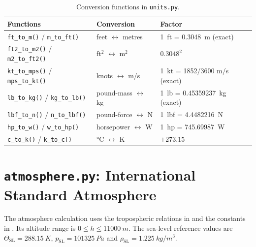 \documentclass[11pt,letterpaper]{article}
\numberwithin{equation}{section}
\newcommand{\code}[1]{\textmd{\texttt{#1}}}
\begin{document}
\begin{table}[H]
\centering
\small
\begin{tabular}{@{}lll@{}}
\toprule
\textbf{Functions} & \textbf{Conversion} & \textbf{Factor}\\
\midrule
\code{ft\_to\_m()} / \code{m\_to\_ft()} & feet $\leftrightarrow$ metres & \SI{1}{ft} = \SI{0.3048}{m} (exact)\\
\code{ft2\_to\_m2()} / \code{m2\_to\_ft2()} & ft$^2$ $\leftrightarrow$ m$^2$ & $0.3048^2$\\
\code{kt\_to\_mps()} / \code{mps\_to\_kt()} & knots $\leftrightarrow$ m/s & \SI{1}{kt} = 1852/3600 \si{m/s} (exact)\\
\code{lb\_to\_kg()} / \code{kg\_to\_lb()} & pound-mass $\leftrightarrow$ kg & \SI{1}{lb} = \SI{0.45359237}{kg} (exact)\\
\code{lbf\_to\_n()} / \code{n\_to\_lbf()} & pound-force $\leftrightarrow$ N & \SI{1}{lbf} = \SI{4.4482216}{N}\\
\code{hp\_to\_w()} / \code{w\_to\_hp()} & horsepower $\leftrightarrow$ W & \SI{1}{hp} = \SI{745.69987}{W}\\
\code{c\_to\_k()} / \code{k\_to\_c()} & \si{\celsius} $\leftrightarrow$ K & $+273.15$\\
\bottomrule
\end{tabular}
\caption{Conversion functions in \code{units.py}.}\label{tab:units}
\end{table}

\section{\code{atmosphere.py}: International Standard Atmosphere}\label{sec:atmosphere}
The atmosphere calculation uses the tropospheric relations in \cite[Ch.~3]{ANDERSON-ITF} and the constants in \cite{ICAO-7488}. Its altitude range is $0 \le h \le \SI{11000}{m}$. The sea-level reference values are $\Theta_\text{SL} = \SI{288.15}{K}$, $p_\text{SL} = \SI{101325}{Pa}$ and $\rho_\text{SL} = \SI{1.225}{kg/m^3}$.
\end{document}
